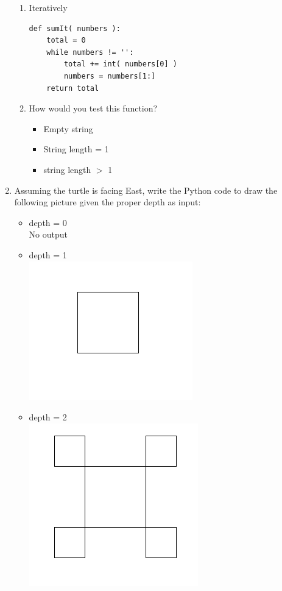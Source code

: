 \documentclass[11pt]{article}
\newenvironment{answer}{\large\lstset{basicstyle=\tiny}\color{white}}{}
\newenvironment{answer}{\large\lstset{basicstyle=\large}\color{red}}{}
\begin{document}
\begin{enumerate}
\begin{enumerate}
            \item Iteratively
\begin{answer}
\begin{lstlisting}
def sumIt( numbers ):
    total = 0
    while numbers != '':
        total += int( numbers[0] )
        numbers = numbers[1:]
    return total
\end{lstlisting}
\end{answer}
            \item How would you test this function?
                \begin{answer}
                \begin{itemize}
                    \item Empty string 
                    \item String length = 1
                    \item string length $>$ 1
                \end{itemize}
                \end{answer}
\pagebreak
\end{enumerate}
\item Assuming the turtle is facing East, write the Python code to draw the following picture given the proper depth as input:
    \begin{itemize}
            \item depth = 0
           \\No output 
            \item depth = 1\\
            \includegraphics[scale=0.4]{1.png}
            \item depth = 2 \\
            \includegraphics[scale=0.4]{2.png}

\end{itemize}
\end{enumerate}
\end{document}

